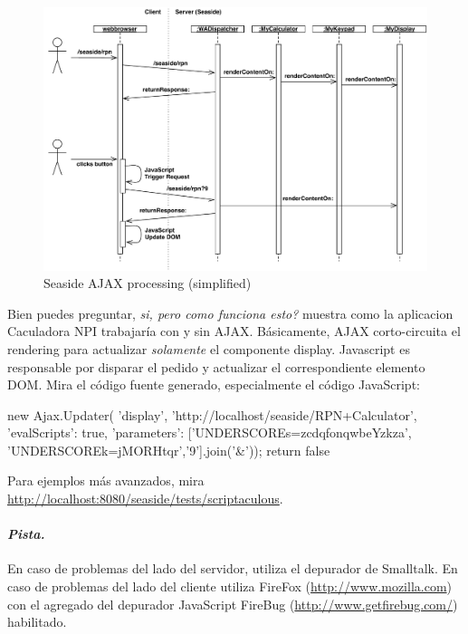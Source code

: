 \documentclass[a4paper,10pt,twoside]{book}
\begin{document}
\begin{figure}[ht]
\begin{center}
\includegraphics[width=\textwidth]{ajax-processing}
\caption{Seaside AJAX processing (simplified)}
\end{center}
\end{figure}


Bien puedes preguntar, \emph{si, pero como funciona esto?}
 muestra como la aplicacion Caculadora NPI trabajar\'ia con y sin AJAX.
B\'asicamente, AJAX corto-circuita el rendering para actualizar \emph{solamente} el componente display.
Javascript es responsable por disparar el pedido y actualizar el correspondiente elemento DOM.
Mira el c\'odigo fuente generado, especialmente el c\'odigo JavaScript:

\begin{code}{}
new Ajax.Updater(
	'display',
	'http://localhost/seaside/RPN+Calculator',
	{'evalScripts': true,
	  'parameters': ['UNDERSCOREs=zcdqfonqwbeYzkza', 'UNDERSCOREk=jMORHtqr','9'].join('&')});
return false
\end{code}

Para ejemplos m\'as avanzados, mira \url{http://localhost:8080/seaside/tests/scriptaculous}.

\paragraph{\emph{Pista.}}
En caso de problemas del lado del servidor, utiliza el depurador de Smalltalk.
En caso de problemas del lado del cliente utiliza FireFox (\url{http://www.mozilla.com}) con el agregado del depurador JavaScript FireBug (\url{http://www.getfirebug.com/}) habilitado.
\end{document}

